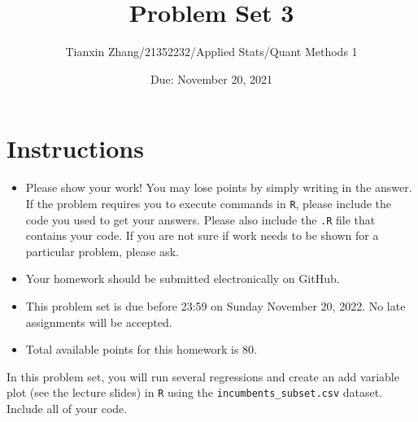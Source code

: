 \documentclass[12pt,letterpaper]{article}
\title{Problem Set 3}
\date{Due: November 20, 2021}
\author{Tianxin Zhang/21352232/Applied Stats/Quant Methods 1}
\begin{document}
	\maketitle
	\section*{Instructions}
	\begin{itemize}
		\item Please show your work! You may lose points by simply writing in the answer. If the problem requires you to execute commands in \texttt{R}, please include the code you used to get your answers. Please also include the \texttt{.R} file that contains your code. If you are not sure if work needs to be shown for a particular problem, please ask.
	\item Your homework should be submitted electronically on GitHub.
	\item This problem set is due before 23:59 on Sunday November 20, 2022. No late assignments will be accepted.
	\item Total available points for this homework is 80.
	\end{itemize}

		\vspace{.25cm}
	
\noindent In this problem set, you will run several regressions and create an add variable plot (see the lecture slides) in \texttt{R} using the \texttt{incumbents\_subset.csv} dataset. Include all of your code.

	\vspace{.5cm}
\end{document}
